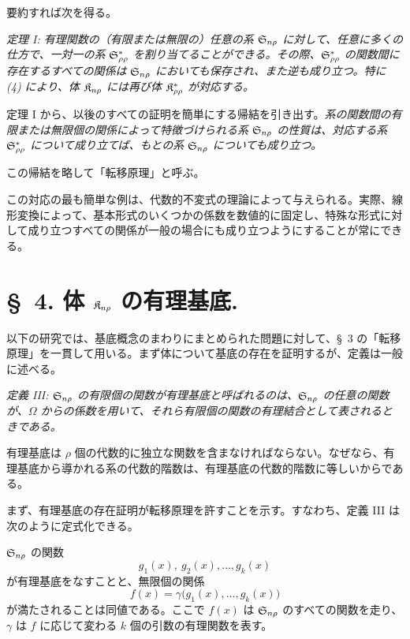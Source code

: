 \documentclass[11pt]{article}
\begin{document}
要約すれば次を得る。

\emph{定理 I: 有理関数の（有限または無限の）任意の系 $\mathfrak{S}_{n\rho}$ に対して、任意に多くの仕方で、一対一の系 $\mathfrak{S}^*_{\rho\rho}$ を割り当てることができる。その際、$\mathfrak{S}^*_{\rho\rho}$ の関数間に存在するすべての関係は $\mathfrak{S}_{n\rho}$ においても保存され、また逆も成り立つ。特に (4) により、体 $\mathfrak{K}_{n\rho}$ には再び体 $\mathfrak{K}^*_{\rho\rho}$ が対応する。}

定理 I から、以後のすべての証明を簡単にする帰結を引き出す。\emph{系の関数間の有限または無限個の関係によって特徴づけられる系 $\mathfrak{S}_{n\rho}$ の性質は、対応する系 $\mathfrak{S}^*_{\rho\rho}$ について成り立てば、もとの系 $\mathfrak{S}_{n\rho}$ についても成り立つ。}

この帰結を略して「転移原理」と呼ぶ。

\providecommand{\Lsys}{\mathfrak{L}}
\providecommand{\Jdom}{\mathfrak{J}}

\clearpage
この対応の最も簡単な例は、代数的不変式の理論によって与えられる。実際、線形変換によって、基本形式のいくつかの係数を数値的に固定し、特殊な形式に対して成り立つすべての関係が一般の場合にも成り立つようにすることが常にできる。

\section*{\S\ 4. 体 $\mathfrak{K}_{n\rho}$ の有理基底.}

以下の研究では、基底概念のまわりにまとめられた問題に対して、\S\ 3 の「転移原理」を一貫して用いる。まず体について基底の存在を証明するが、定義は一般に述べる。

\emph{定義 III: $\mathfrak{S}_{n\rho}$ の有限個の関数が有理基底と呼ばれるのは、$\mathfrak{S}_{n\rho}$ の任意の関数が、$\Omega$ からの係数を用いて、それら有限個の関数の有理結合として表されるときである。}

有理基底は $\rho$ 個の代数的に独立な関数を含まなければならない。なぜなら、有理基底から導かれる系の代数的階数は、有理基底の代数的階数に等しいからである。

まず、有理基底の存在証明が転移原理を許すことを示す。すなわち、定義 III は次のように定式化できる。

$\mathfrak{S}_{n\rho}$ の関数
\[
  g_1(x),\ g_2(x),\ldots, g_k(x)
\]
が有理基底をなすことと、無限個の関係
\begin{equation}
  f(x)=\gamma\bigl(g_1(x),\ldots,g_k(x)\bigr)
\tag{1}
\end{equation}
が満たされることは同値である。ここで $f(x)$ は $\mathfrak{S}_{n\rho}$ のすべての関数を走り、$\gamma$ は $f$ に応じて変わる $k$ 個の引数の有理関数を表す。
\end{document}
